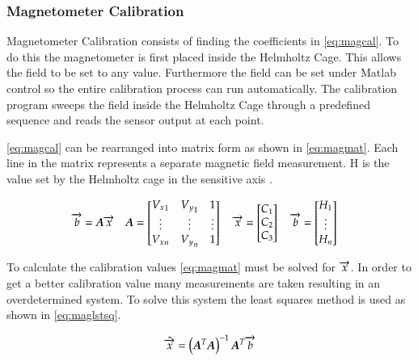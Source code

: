 \subsubsection{Magnetometer Calibration}

Magnetometer Calibration consists of finding the coefficients in \autoref{eq:magcal}. To do this the magnetometer is first placed inside the Helmholtz Cage. This allows the field to be set to any value. Furthermore the field can be set under Matlab control so the entire calibration process can run automatically. The calibration program sweeps the field inside the Helmholtz Cage through a predefined sequence and reads the sensor output at each point. 

\autoref{eq:magcal} can be rearranged into matrix form as shown in \autoref{eq:magmat}. Each line in the matrix represents a separate magnetic field measurement. H is the value set by the Helmholtz cage in the sensitive axis . 

\begin{equation}
    \overrightarrow{b}=\boldsymbol{A} \overrightarrow{x} \quad
    \boldsymbol{A} =
    \begin{bmatrix}
        {V_x}_1 & {V_y}_1 & 1 \\
        \vdots & \vdots & \vdots\\
        {V_x}_n & {V_y}_n & 1 \\
    \end{bmatrix} \quad
    \overrightarrow{x} = 
    \begin{bmatrix}
        C_1 \\
        C_2 \\
        C_3 \\
    \end{bmatrix} \quad
    \overrightarrow{b} = 
    \begin{bmatrix}
        H_1 \\
        \vdots \\
        H_n \\
    \end{bmatrix} \quad
    \label{eq:magmat}
\end{equation}

To calculate the calibration values \autoref{eq:magmat} must be solved for $\overrightarrow{x}$. In order to get a better calibration value many measurements are taken resulting in an overdetermined system. To solve this system the least squares method is used as shown in \autoref{eq:maglstsq}.

\begin{equation}
    \hat{\overrightarrow{x}} = \left(\boldsymbol{A} ^T \boldsymbol{A} \right) ^ {-1} \boldsymbol{A} ^T \overrightarrow{b}
    \label{eq:maglstsq}
\end{equation}

